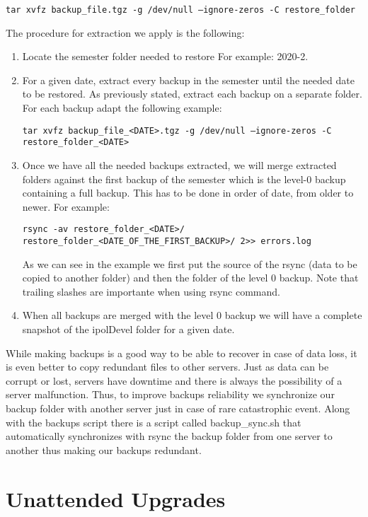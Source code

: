 \documentclass[a4paper,12pt]{article}
\begin{document}
{\tt tar xvfz backup\_file.tgz -g /dev/null --ignore-zeros -C restore\_folder}

The procedure for extraction we apply is the following:

\begin{enumerate}
  \item Locate the semester folder needed to restore For example: 2020-2.
  \item For a given date, extract every backup in the semester until the needed date to be restored. As previously stated, extract each backup on a separate folder. For each backup adapt the following example:

  {\tt tar xvfz backup\_file\_<DATE>.tgz -g /dev/null --ignore-zeros -C restore\_folder\_<DATE>}
  \item Once we have all the needed backups extracted, we will merge extracted folders against the first backup of the semester which is the level-0 backup containing a full backup. This has to be done in order of date, from older to newer. For example:
  
  {\tt rsync -av restore\_folder\_<DATE>/ restore\_folder\_<DATE\_OF\_THE\_FIRST\_BACKUP>/ 2>> errors.log}

  As we can see in the example we first put the source of the rsync (data to be copied to another folder) and then the folder of the level 0 backup. Note that trailing slashes are importante when using rsync command.
  \item When all backups are merged with the level 0 backup we will have a complete snapshot of the ipolDevel folder for a given date.
\end{enumerate}

While making backups is a good way to be able to recover in case of data loss, it is even better to copy redundant files to other servers. Just as data can be corrupt or lost, servers have downtime and there is always the possibility of a server malfunction. Thus, to improve backups reliability we synchronize our backup folder with another server just in case of rare catastrophic event. Along with the backups script there is a script called backup\_sync.sh that automatically synchronizes with rsync the backup folder from one server to another thus making our backups redundant.


\section{Unattended Upgrades}
\end{document}
